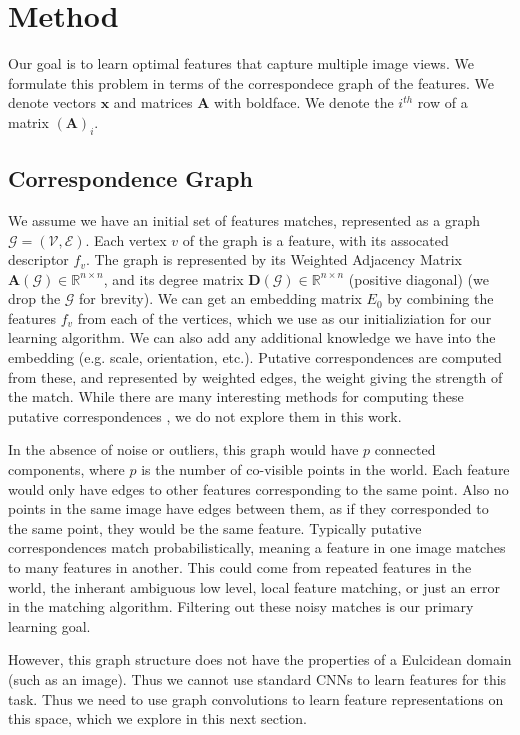 \documentclass[10pt,twocolumn,letterpaper]{article}
\newcommand{\bR}{\mathbb{R}}
\newcommand{\mat}[1]{\mathbf{#1}}
\begin{document}
\section{Method}
Our goal is to learn optimal features that capture multiple image views.
We formulate this problem in terms of the correspondece graph of the features.
We denote vectors $\mat{x}$ and matrices $\mat{A}$ with boldface.
We denote the $i^{th}$ row of a matrix $(\mat{A})_i$.
\subsection{Correspondence Graph}
We assume we have an initial set of features matches, represented as a graph $\mathcal{G} = (\mathcal{V}, \mathcal{E})$.
Each vertex $v$ of the graph is a feature, with its assocated descriptor $f_v$. 
The graph is represented by its Weighted Adjacency Matrix $\mat{A}(\mathcal{G}) \in \bR^{n \times n}$, and its degree matrix $\mat{D}(\mathcal{G}) \in \bR^{n \times n}$ (positive diagonal) (we drop the $\mathcal{G}$ for brevity).
We can get an embedding matrix $E_0$ by combining the features $f_v$ from each of the vertices, which we use as our initializiation for our learning algorithm.
We can also add any additional knowledge we have into the embedding (e.g. scale, orientation, etc.).
Putative correspondences are computed from these, and represented by weighted edges, the weight giving the strength of the match.
While there are many interesting methods for computing these putative correspondences \cite{suh2015subgraph, yi2018learning}, we do not explore them in this work.

In the absence of noise or outliers, this graph would have $p$ connected components, where $p$ is the number of co-visible points in the world.
Each feature would only have edges to other features corresponding to the same point.
Also no points in the same image have edges between them, as if they corresponded to the same point, they would be the same feature.
Typically putative correspondences match probabilistically, meaning a feature in one image matches to many features in another.
This could come from repeated features in the world, the inherant ambiguous low level, local feature matching, or just an error in the matching algorithm.
Filtering out these noisy matches is our primary learning goal.

However, this graph structure does not have the properties of a Eulcidean domain (such as an image).
Thus we cannot use standard CNNs to learn features for this task.
Thus we need to use graph convolutions to learn feature representations on this space, which we explore in this next section.
\end{document}
